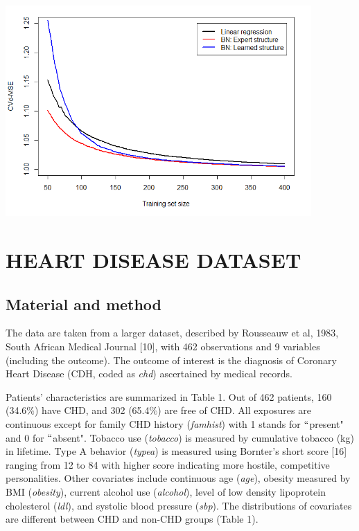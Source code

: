 \documentclass{article}
\begin{document}
\begin{center}
\includegraphics[width=4.59in,height=3.17in]{./media/image4.png}
\end{center}
\vspace{-2.5em}




\section{HEART DISEASE DATASET}

\subsection{Material and method}
The data are taken from a larger dataset, described by Rousseauw et al, 1983, South African Medical Journal [10], with 462 observations and 9 variables (including the outcome). The outcome of interest is the diagnosis of Coronary Heart Disease (CDH, coded as\textit{ chd}) ascertained by medical records. \par

\vspace{\baselineskip}
Patients’ characteristics are summarized in Table 1. Out of 462 patients, 160 (34.6$\%$) have CHD, and 302 (65.4$\%$) are free of CHD. All exposures are continuous except for family CHD history (\textit{famhist}) with 1 stands for $``$present" and 0 for $``$absent". Tobacco use (\textit{tobacco}) is measured by cumulative tobacco (kg) in lifetime. Type A behavior (\textit{typea}) is measured using Bornter’s short score [16] ranging from 12 to 84 with higher score indicating more hostile, competitive personalities. Other covariates include continuous age (\textit{age}), obesity measured by BMI (\textit{obesity}), current alcohol use (\textit{alcohol}), level of low density lipoprotein cholesterol (\textit{ldl}), and systolic blood pressure (\textit{sbp}). The distributions of covariates are different between CHD and non-CHD groups (Table 1). \par
\end{document}

